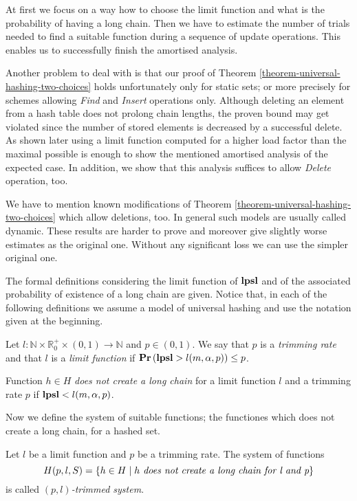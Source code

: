 At first we focus on a way how to choose the limit function and what is the probability of having a long chain. Then we have to estimate the number of trials needed to find a suitable function during a sequence of update operations. This enables us to successfully finish the amortised analysis.

Another problem to deal with is that our proof of Theorem \ref{theorem-universal-hashing-two-choices} holds unfortunately only for static sets; or more precisely for schemes allowing \emph{Find} and \emph{Insert} operations only. Although deleting an element from a hash table does not prolong chain lengths, the proven bound may get violated since the number of stored elements is decreased by a successful delete. As shown later using a limit function computed for a higher load factor than the maximal possible is enough to show the mentioned amortised analysis of the expected case. In addition, we show that this analysis suffices to allow \emph{Delete} operation, too. 

We have to mention known modifications of Theorem \ref{theorem-universal-hashing-two-choices} which allow deletions, too. In general such models are usually called dynamic. These results are harder to prove and moreover give slightly worse estimates as the original one. Without any significant loss we can use the simpler original one.

The formal definitions considering the limit function of $\mathbf{lpsl}$ and of the associated probability of existence of a long chain are given. Notice that, in each of the following definitions we assume a model of universal hashing and use the notation given at the beginning.

\begin{definition}
Let $l: \mathbb{N} \times \mathbb{R}_0^+ \times (0, 1) \rightarrow \mathbb{N}$ and $p \in (0, 1)$.  We say that $p$ is a \emph{trimming rate} and that $l$ is a \emph{limit function} if  $\mathbf{Pr}\left(\mathbf{lpsl} > l(m, \alpha, p)\right) \leq p$.

Function $h \in H$ \emph{does not create a long chain} for a limit function $l$ and a trimming rate $p$ if $\mathbf{lpsl} < l(m, \alpha, p)$.
\end{definition}

Now we define the system of suitable functions; the functiones which does not create a long chain, for a hashed set.
\begin{definition}
Let $l$ be a limit function and $p$ be a trimming rate. The system of functions \[ H(p, l, S) = \{ h \in H \mid h \textit{ does not create a long chain for l and p} \} \] is called \emph{$(p, l)$-trimmed system}.
\end{definition}


